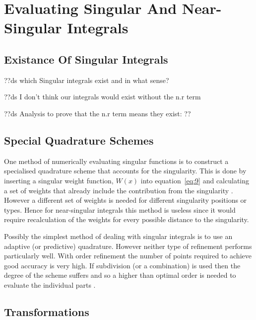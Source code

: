 
\section{Evaluating Singular And Near-Singular Integrals}

\subsection{Existance Of Singular Integrals}
??ds which Singular integrals exist and in what sense?

??ds I don't think our integrals would exist without the n.r term

??ds Analysis to prove that the n.r term means they exist: ??


\subsection{Special Quadrature Schemes}

One method of numerically evaluating singular functions is to construct a specialised quadrature scheme that accounts for the singularity. This is done by inserting a singular weight function, $W(x)$ into equation~\eqref{eq:9} and calculating a set of weights that already include the contribution from the singularity \cite{Kolm2001}. However a different set of weights is needed for different singularity positions or types. Hence for near-singular integrals this method is useless since it would require recalculation of the weights for every possible distance to the singularity.

Possibly the simplest method of dealing with singular integrals is to use an adaptive (or predictive) quadrature. However neither type of refinement performs particularly well. With order refinement the number of points required to achieve good accuracy is very high. If subdivision (or a combination) is used then the degree of the scheme suffers and so a higher than optimal order is needed to evaluate the individual parts \cite{Telles1987}.

\subsection{Transformations}

